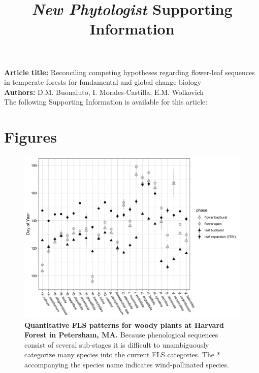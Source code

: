 \documentclass[11pt]{article}
\title{\textit{New Phytologist} Supporting Information}
\date{}
\begin{document}
\maketitle

\noindent \textbf{Article title:} Reconciling competing hypotheses regarding flower-leaf sequences in temperate forests for fundamental and global change biology\\
\noindent \textbf{Authors:} D.M. Buonaiuto, I. Morales-Castilla, E.M. Wolkovich\\

\noindent The following Supporting Information is available for this article:\\

\pagebreak[4]

\section*{Figures}
\begin{figure}[H]
\centering
\includegraphics[width=\textwidth]{..//..//HarvardForest/HFmeans_expanded.jpeg} 
\caption{\textbf{Quantitative FLS patterns for woody plants at Harvard Forest in Petersham, MA.} Because phenological sequences consist of several sub-stages it is difficult to unambiguously categorize many species into the current FLS categories. The * accompanying the species name indicates wind-pollinated species.}
\label{fig:HFmeans}
\end{figure}
\end{document}
